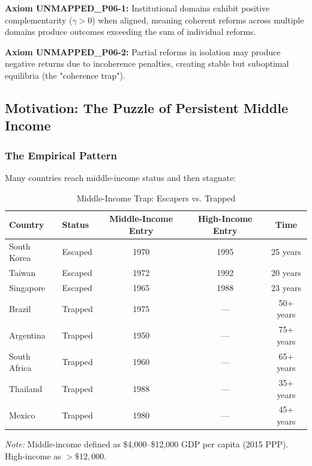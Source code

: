 \begin{tcolorbox}[colback=yellow!5!white, colframe=yellow!75!black,
    title=Axiom UNMAPPED_P06-1: Coherence Complementarity]
\textbf{Axiom UNMAPPED_P06-1:}
Institutional domains exhibit positive complementarity ($\gamma > 0$) when aligned,
meaning coherent reforms across multiple domains produce outcomes exceeding the
sum of individual reforms.
\end{tcolorbox}

\begin{tcolorbox}[colback=yellow!5!white, colframe=yellow!75!black,
    title=Axiom UNMAPPED_P06-2: Partial Reform Trap]
\textbf{Axiom UNMAPPED_P06-2:}
Partial reforms in isolation may produce negative returns due to incoherence
penalties, creating stable but suboptimal equilibria (the "coherence trap").
\end{tcolorbox}



\subsection{Motivation: The Puzzle of Persistent Middle Income}

\subsubsection{The Empirical Pattern}

Many countries reach middle-income status and then stagnate:

\begin{table}[htbp]
\centering
\caption{Middle-Income Trap: Escapers vs. Trapped}
\label{tab:mit-examples}
\small
\begin{tabular}{@{}llccc@{}}
\toprule
\textbf{Country} & \textbf{Status} & \textbf{Middle-Income Entry} & \textbf{High-Income Entry} & \textbf{Time} \\
\midrule
South Korea & Escaped & 1970 & 1995 & 25 years \\
Taiwan & Escaped & 1972 & 1992 & 20 years \\
Singapore & Escaped & 1965 & 1988 & 23 years \\
\midrule
Brazil & Trapped & 1975 & --- & 50+ years \\
Argentina & Trapped & 1950 & --- & 75+ years \\
South Africa & Trapped & 1960 & --- & 65+ years \\
Thailand & Trapped & 1988 & --- & 35+ years \\
Mexico & Trapped & 1980 & --- & 45+ years \\
\bottomrule
\end{tabular}
\begin{flushleft}
\small\textit{Note:} Middle-income defined as \$4,000--\$12,000 GDP per capita (2015 PPP). High-income as $>\$12,000$.
\end{flushleft}
\end{table}

